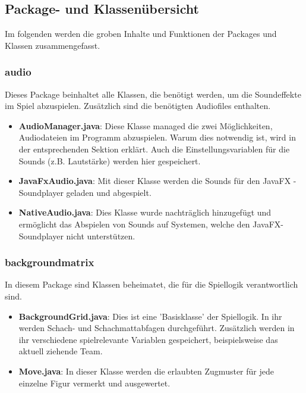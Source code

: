 \documentclass[12pt,a4paper]{article}
\begin{document}
{\newpage
\subsection{Package- und Klassenübersicht}
\label{SUBSEC:PACKAGE}

Im folgenden werden die groben Inhalte und Funktionen der Packages und Klassen zusammengefasst.\

\subsubsection{audio}

Dieses Package beinhaltet alle Klassen, die benötigt werden, um die Soundeffekte im Spiel abzuspielen. Zusätzlich sind die benötigten Audiofiles enthalten.\

\begin{itemize}
	\item{\textbf{AudioManager.java}: Diese Klasse managed die zwei Möglichkeiten, Audiodateien im Programm abzuspielen. Warum dies notwendig ist, wird in der entsprechenden Sektion erklärt. %
Auch die Einstellungsvariablen für die Sounds (z.B. Lautstärke) werden hier gespeichert. }
	
	\item{\textbf{JavaFxAudio.java}: Mit dieser Klasse werden die Sounds für den JavaFX - Soundplayer geladen und abgespielt. }	
	
	\item{\textbf{NativeAudio.java}: Dies Klasse wurde nachträglich hinzugefügt und ermöglicht das Abspielen von Sounds auf Systemen, welche den JavaFX-Soundplayer nicht unterstützen.}
	
\end{itemize}

\subsubsection{backgroundmatrix}

In diesem Package sind Klassen beheimatet, die für die Spiellogik verantwortlich sind.

\begin{itemize}
	\item{\textbf{BackgroundGrid.java}: Dies ist eine 'Basisklasse' der Spiellogik. In ihr werden Schach- und Schachmattabfagen durchgeführt. Zusätzlich werden in ihr verschiedene spielrelevante Variablen gespeichert, beispielsweise das aktuell ziehende Team.}
	
	\item{\textbf{Move.java}: In dieser Klasse werden die erlaubten Zugmuster für jede einzelne Figur vermerkt und ausgewertet.  }


\end{itemize}}
\end{document}
